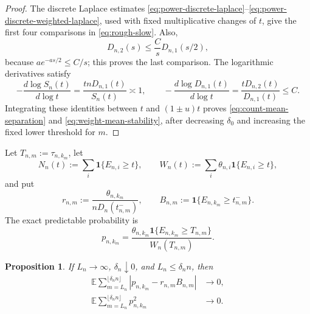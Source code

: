 \documentclass[11pt]{article}
\newtheorem{proposition}[theorem]{Proposition}
\theoremstyle{remark}
\theoremstyle{plain}
\newcommand{\E}{\mathbb E}
\newcommand{\one}{\mathbf 1}
\begin{document}
\begin{proof}
The discrete Laplace estimates
\eqref{eq:power-discrete-laplace}--\eqref{eq:power-discrete-weighted-laplace},
used with fixed multiplicative changes of $t$, give the first four comparisons
in \eqref{eq:rough-slow}.  Also,
\[
 D_{n,2}(s)\le\frac{C}{s}D_{n,1}(s/2),
\]
because $ae^{-as/2}\le C/s$; this proves the last comparison.  The logarithmic
derivatives satisfy
\[
 -\frac{d\log S_n(t)}{d\log t}
 =\frac{tnD_{n,1}(t)}{S_n(t)}\asymp1,
 \qquad
 -\frac{d\log D_{n,1}(t)}{d\log t}
 =\frac{tD_{n,2}(t)}{D_{n,1}(t)}\le C.
\]
Integrating these identities between $t$ and $(1\pm u)t$ proves
\eqref{eq:count-mean-separation} and \eqref{eq:weight-mean-stability}, after
decreasing $\delta_0$ and increasing the fixed lower threshold for $m$.
\end{proof}

Let $T_{n,m}:=\tau_{n,k_m}$, let
\begin{equation}\label{eq:random-populations}
 N_n(t):=\sum_i\one\{E_{n,i}\ge t\},\qquad
 W_n(t):=\sum_i\theta_{n,i}\one\{E_{n,i}\ge t\},
\end{equation}
and put
\begin{equation}\label{eq:slow-r-B}
 r_{n,m}:=\frac{\theta_{n,k_m}}{nD_n(t_{n,m}^-)},\qquad
 B_{n,m}:=\one\{E_{n,k_m}\ge t_{n,m}^-\}.
\end{equation}
The exact predictable probability is
\begin{equation}\label{eq:exact-tail-p}
 p_{n,k_m}
 =\frac{\theta_{n,k_m}\one\{E_{n,k_m}\ge T_{n,m}\}}
 {W_n(T_{n,m})}.
\end{equation}

\begin{proposition}
\label{prop:slow-compensator}
If $L_n\to\infty$, $\delta_n\downarrow0$, and
$L_n\le\delta_n n$, then
\begin{align}
 \E\sum_{m=L_n}^{\lfloor\delta_n n\rfloor}
 \left|p_{n,k_m}-r_{n,m}B_{n,m}\right|&\longrightarrow0,
 \label{eq:slow-L1}\\
 \E\sum_{m=L_n}^{\lfloor\delta_n n\rfloor}p_{n,k_m}^2
 &\longrightarrow0.\label{eq:slow-squares}
\end{align}
\end{proposition}
\end{document}
